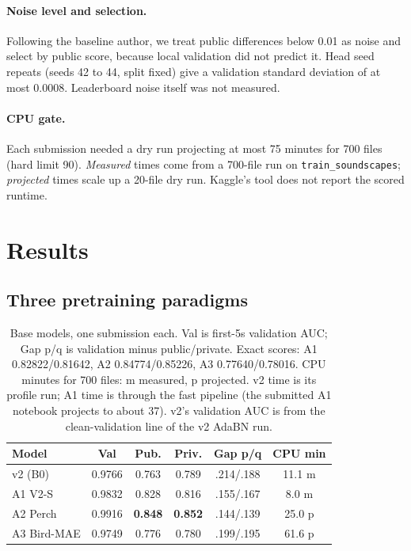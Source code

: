 \documentclass[letterpaper]{article} %
\begin{document}
\paragraph{Noise level and selection.}
Following the baseline author, we treat public differences below 0.01 as noise and select by public score, because local validation did not predict it. Head seed repeats (seeds 42 to 44, split fixed) give a validation standard deviation of at most 0.0008. Leaderboard noise itself was not measured.

\paragraph{CPU gate.}
Each submission needed a dry run projecting at most 75 minutes for 700 files (hard limit 90). \emph{Measured} times come from a 700-file run on \texttt{train\_soundscapes}; \emph{projected} times scale up a 20-file dry run. Kaggle's tool does not report the scored runtime.

\section{Results}
\subsection{Three pretraining paradigms}
\begin{table}[t]
\centering
\small
\begin{tabular}{lccccc}
\toprule
Model & Val & Pub. & Priv. & Gap p/q & CPU min \\
\midrule
v2 (B0) & 0.9766 & 0.763 & 0.789 & .214/.188 & 11.1 m \\
A1 V2-S & 0.9832 & 0.828 & 0.816 & .155/.167 & 8.0 m \\
A2 Perch & 0.9916 & \textbf{0.848} & \textbf{0.852} & .144/.139 & 25.0 p \\
A3 Bird-MAE & 0.9749 & 0.776 & 0.780 & .199/.195 & 61.6 p \\
\bottomrule
\end{tabular}
\caption{Base models, one submission each. Val is first-5s validation AUC; Gap p/q is validation minus public/private. Exact scores: A1 0.82822/0.81642, A2 0.84774/0.85226, A3 0.77640/0.78016. CPU minutes for 700 files: m measured, p projected. v2 time is its profile run; A1 time is through the fast pipeline (the submitted A1 notebook projects to about 37). v2's validation AUC is from the clean-validation line of the v2 AdaBN run.}
\label{tab:base}
\end{table}
\end{document}
